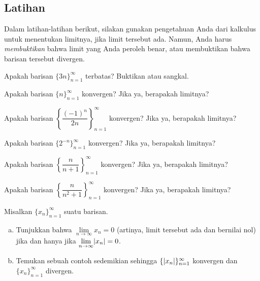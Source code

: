 \subsection{Latihan}

\begin{exnote}
Dalam latihan-latihan berikut, silakan gunakan pengetahuan Anda dari kalkulus untuk
menentukan limitnya, jika limit tersebut ada.  Namun, Anda harus \emph{membuktikan}
bahwa limit yang
Anda peroleh benar, atau membuktikan bahwa barisan tersebut divergen.
\end{exnote}

\begin{exercise}
Apakah barisan
$\{ 3n \}_{n=1}^\infty$
terbatas?  Buktikan atau sangkal.
\end{exercise}

\begin{exercise}
Apakah barisan
$\{ n \}_{n=1}^\infty$
konvergen?  Jika ya, berapakah limitnya?
\end{exercise}

\begin{exercise}
Apakah barisan
$\left\{ \dfrac{{(-1)}^n}{2n} \right\}_{n=1}^\infty$
konvergen?  Jika ya, berapakah limitnya?
\end{exercise}

\begin{exercise}
Apakah barisan
$\{ 2^{-n} \}_{n=1}^\infty$
konvergen?  Jika ya, berapakah limitnya?
\end{exercise}

\begin{exercise}
Apakah barisan
$\left\{ \dfrac{n}{n+1} \right\}_{n=1}^\infty$
konvergen?  Jika ya, berapakah limitnya?
\end{exercise}

\begin{exercise}
Apakah barisan
$\left\{ \dfrac{n}{n^2+1} \right\}_{n=1}^\infty$
konvergen?  Jika ya, berapakah limitnya?
\end{exercise}

\begin{exercise} \label{exercise:absconv}
Misalkan $\{ x_n \}_{n=1}^\infty$ suatu barisan.
\begin{enumerate}[a)]
\item Tunjukkan bahwa $\lim\limits_{n\to\infty} x_n = 0$ (artinya, limit tersebut ada dan bernilai nol)
jika dan hanya jika $\lim\limits_{n\to\infty} \lvert {x_n} \rvert = 0$.
\item Temukan sebuah contoh sedemikian sehingga $\{ \lvert {x_n} \rvert \}_{n=1}^\infty$ konvergen dan
$\{ x_n \}_{n=1}^\infty$
divergen.
\end{enumerate}
\end{exercise}

